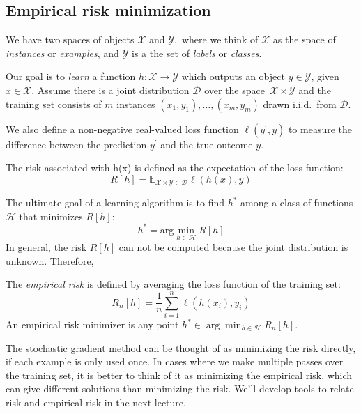 \subsection{Empirical risk minimization}
We have two spaces of objects $\mathcal{X}$ and ${\mathcal{Y}},$ where we think
of $\mathcal{X}$ as the space of \emph{instances} or \emph{examples}, and
$\mathcal{Y}$ is a the set of \emph{labels} or \emph{classes}.

Our goal is to \emph{learn} a function $h\colon\mathcal{X}\to\mathcal{Y}$ which
outputs an object $y\in \mathcal{Y}$, given $ x\in \mathcal{X}$.  Assume there
is a joint distribution $\mathcal{D}$ over the space~$\mathcal{X} \times
\mathcal{Y}$ and the training set consists of $m$ instances $(x_1, y_1), \ldots,
(x_m,y_m)$ drawn i.i.d.~from $\mathcal{D}$.

We also define a non-negative real-valued loss function $\ell(y^\prime,y)$ to
measure the difference between the prediction $y^\prime$ and the true outcome
$y$.

\begin{definition}
The risk associated with h(x) is defined as the expectation of the loss function:
\begin{equation*}
    R[h] = \mathbb{E}_{\mathcal{X} \times \mathcal{Y} \in \mathcal{D}} \ell(h(x),y)
\end{equation*}
\end{definition}
The ultimate goal of a learning algorithm is to find $h^*$ among a class of functions $\mathcal{H}$ that minimizes $R[h]$:
\begin{equation*}
    h^* = \text{arg}\min_{h \in \mathcal{H}} R[h]
\end{equation*}
In general, the risk $R[h]$ can not be computed because the joint distribution is unknown. Therefore,

The \emph{empirical risk} is defined by averaging the loss function of the training set:
\begin{equation*}
    R_n[h] = \frac{1}{n} \sum^n_{i=1}\ell(h(x_i),y_i)
\end{equation*}
An empirical risk minimizer is any point $h^* \in \arg\min_{h \in \mathcal{H}} R_n[h]$.

The stochastic gradient method can be thought of as minimizing the risk
directly, if each example is only used once. In cases where we make multiple
passes over the training set, it is better to think of it as minimizing the
empirical risk, which can give different solutions than minimizing the risk.
We'll develop tools to relate risk and empirical risk in the next lecture.

